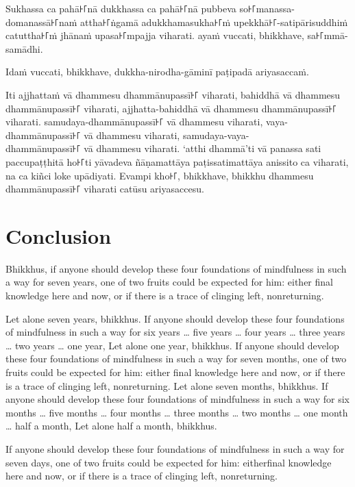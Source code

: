 Sukhassa ca pahā꜔꜒nā dukkhassa ca pahā꜔꜒nā pubbeva so꜔꜒manassa-domanassā꜔꜒naṁ attha꜔꜒ṅgamā
adukkhamasukha꜔꜒ṁ upekkhā꜔꜒-satipārisuddhiṁ catuttha꜔꜒ṁ jhānaṁ upasa꜔꜒mpajja viharati.
ayaṁ vuccati, bhikkhave, sa꜔꜒mmā-samādhi.

Idaṁ vuccati, bhikkhave, dukkha-nirodha-gāminī paṭipadā ariyasaccaṁ.

Iti ajjhattaṁ vā dhammesu dhammānupassī꜔꜒ viharati,
bahiddhā vā dhammesu dhammānupassī꜔꜒ viharati,
ajjhatta-bahiddhā vā dhammesu dhammānupassī꜔꜒ viharati.
samudaya-dhammānupassī꜔꜒ vā dhammesu viharati,
vaya-dhammānupassī꜔꜒ vā dhammesu viharati,
samudaya-vaya-\\ dhammānupassī꜔꜒ vā dhammesu viharati.
‘atthi dhammā’ti vā panassa sati paccupaṭṭhitā ho꜔꜒ti
yāvadeva ñāṇamattāya paṭissatimattāya anissito ca viharati,
na ca kiñci loke upādiyati. Evampi kho꜔꜒, bhikkhave, bhikkhu
dhammesu dhammānupassī꜔꜒ viharati catūsu ariyasaccesu.



\englishPage
\chapter{Conclusion}

Bhikkhus, if anyone should develop these four foundations of mindfulness in
such a way for seven years, one of two fruits could be expected for him: either
final knowledge here and now, or if there is a trace of clinging left,
nonreturning.

Let alone seven years, bhikkhus. If anyone should develop these four
foundations of mindfulness in such a way for six years \ldots{} five years
\ldots{} four years \ldots{} three years \ldots{} two years \ldots{} one year,
Let alone one year, bhikkhus. If anyone should develop these four foundations
of mindfulness in such a way for seven months, one of two fruits could be
expected for him: either final knowledge here and now, or if there is a trace of
clinging left, nonreturning. Let alone seven months, bhikkhus. If anyone should
develop these four foundations of mindfulness in such a way for six months
\ldots{} five months \ldots{} four months \ldots{} three months \ldots{} two
months \ldots{} one month \ldots{} half a month, Let alone half a month,
bhikkhus.

If anyone should develop these four foundations of mindfulness in such a way
for seven days, one of two fruits could be expected for him: eitherfinal
knowledge here and now, or if there is a trace of clinging left, nonreturning.

